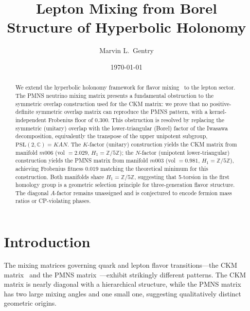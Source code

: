 \documentclass[floatfix,aps,prd,twocolumn,showpacs,superscriptaddress,longbibliography]{revtex4-2}
\newcommand{\PSL}{\mathrm{PSL}(2,\mathbb{C})}
\newcommand{\Zfive}{\mathbb{Z}/5\mathbb{Z}}
\begin{document}
\title{Lepton Mixing from Borel Structure of Hyperbolic Holonomy}

\author{Marvin L.~Gentry}

\date{\today}

\begin{abstract}
We extend the hyperbolic holonomy framework for flavor mixing~\cite{Gentry:CKM}
to the lepton sector. The PMNS neutrino mixing matrix presents a fundamental
obstruction to the symmetric overlap construction used for the CKM matrix:
we prove that no positive-definite symmetric overlap matrix can reproduce the
PMNS pattern, with a kernel-independent Frobenius floor of $0.300$.
This obstruction is resolved by replacing the symmetric (unitary) overlap
with the lower-triangular (Borel) factor of the Iwasawa decomposition, equivalently the transpose of the upper unipotent subgroup,
$\PSL = KAN$. The $K$-factor (unitary) construction yields the CKM matrix
from manifold $m006$ (vol $= 2.029$, $H_1 = \Zfive$); the $N$-factor
(unipotent lower-triangular) construction yields the PMNS matrix from
manifold $m003$ (vol $= 0.981$, $H_1 = \Zfive$), achieving Frobenius
fitness $0.019$ matching the theoretical minimum for this construction.
Both manifolds share $H_1 = \Zfive$, suggesting that 5-torsion in the
first homology group is a geometric selection principle for three-generation
flavor structure. The diagonal $A$-factor remains unassigned and is
conjectured to encode fermion mass ratios or CP-violating phases.
\end{abstract}


\maketitle

\section{Introduction}
\label{sec:intro}

The mixing matrices governing quark and lepton flavor transitions---the
CKM matrix~\cite{Cabibbo:1963yz,Kobayashi:1973fv} and the PMNS
matrix~\cite{Pontecorvo:1957cp,Maki:1962mu}---exhibit strikingly different
patterns. The CKM matrix is nearly diagonal with a hierarchical structure,
while the PMNS matrix has two large mixing angles and one small one,
suggesting qualitatively distinct geometric origins.
\end{document}
